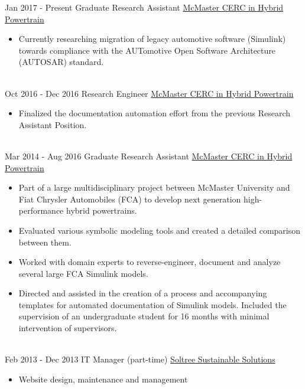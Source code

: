 \documentclass[letterpaper]{twentysecondcv} %
\begin{document}
\vspace{-.5em}
\begin{twenty} %
	\twentyitem
	{Jan 2017 -}
	{Present}
	{Graduate Research Assistant}
	{%
		\href{http://hybrid.mcmaster.ca/}{McMaster CERC in Hybrid Powertrain}}
	{}
	{\begin{itemize}
			\item Currently researching migration of legacy automotive software
			(Simulink) towards compliance with the AUTomotive Open Software 
			Architecture (AUTOSAR) standard.
	\end{itemize}}
	\\
	\twentyitem
	{Oct 2016 -}
	{Dec 2016}
	{Research Engineer}
	{\href{http://hybrid.mcmaster.ca/}{McMaster CERC in Hybrid Powertrain}}
	{}
	{\begin{itemize}
			\item Finalized the documentation automation effort from the previous
			Research Assistant Position.
	\end{itemize}}
	\\
	\twentyitem
	{Mar 2014 -}
	{Aug 2016}
	{Graduate Research Assistant}
	{\href{http://hybrid.mcmaster.ca/}{McMaster CERC in Hybrid Powertrain}}
	{}
	{\begin{itemize}
			\item Part of a large multidisciplinary project
			between McMaster University and Fiat Chrysler Automobiles (FCA) to develop
			next generation high-performance hybrid powertrains.
			\item Evaluated various symbolic modeling tools and created a detailed
			comparison between them.
			\item Worked with domain experts to reverse-engineer, document and analyze
			several large FCA Simulink models.
			\item Directed and assisted in the creation of a process and accompanying
			templates for automated documentation of Simulink models. Included the
			supervision of an undergraduate student for 16 months with minimal
			intervention of supervisors.
	\end{itemize}}
	\\
	\twentyitem
	{Feb 2013 -}
	{Dec 2013}
	{IT Manager (part-time)}
	{\href{http://www.soltree.net/}{Soltree Sustainable Solutions}}
	{}
	{\begin{itemize}
			\item Website design, maintenance and management

\end{itemize}}
\end{twenty}
\end{document}
